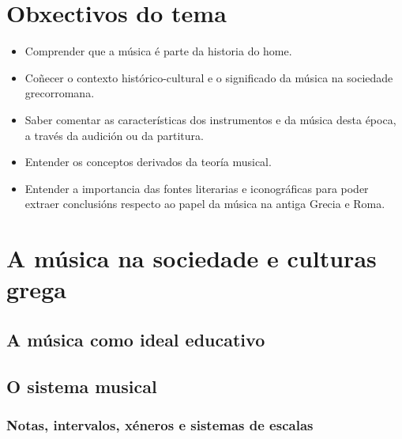 \documentclass[a4paper, twoside]{templates/ociamthesis}
\providecommand{\tightlist}{%
  \setlength{\itemsep}{0pt}\setlength{\parskip}{0pt}}
\begin{document}
\minitoc 

\hypertarget{obxectivos-do-tema-2}{%
\section*{Obxectivos do tema}\label{obxectivos-do-tema-2}}

\begin{itemize}
\tightlist
\item
  Comprender que a música é parte da historia do home.
\item
  Coñecer o contexto histórico-cultural e o significado da música na sociedade grecorromana.
\item
  Saber comentar as características dos instrumentos e da música desta época, a través da audición ou da partitura.
\item
  Entender os conceptos derivados da teoría musical.
\item
  Entender a importancia das fontes literarias e iconográficas para poder extraer conclusións respecto ao papel da música na antiga Grecia e Roma.
\end{itemize}

\hypertarget{a-muxfasica-na-sociedade-e-culturas-grega}{%
\section{A música na sociedade e culturas grega}\label{a-muxfasica-na-sociedade-e-culturas-grega}}

\hypertarget{a-muxfasica-como-ideal-educativo}{%
\subsection{A música como ideal educativo}\label{a-muxfasica-como-ideal-educativo}}

\hypertarget{o-sistema-musical}{%
\subsection{O sistema musical}\label{o-sistema-musical}}

\hypertarget{notas-intervalos-xuxe9neros-e-sistemas-de-escalas}{%
\subsubsection{Notas, intervalos, xéneros e sistemas de escalas}\label{notas-intervalos-xuxe9neros-e-sistemas-de-escalas}}
\end{document}
